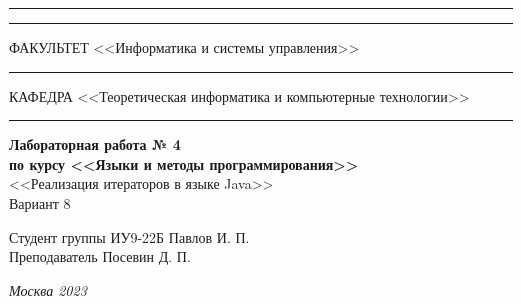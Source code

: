 \documentclass[a4paper, 14pt]{extarticle}
\begin{document}
\begin{titlepage}
\vspace{-25pt}
\hspace{-35pt}\rule{\textwidth}{2.3pt}

\vspace*{-20.3pt}
\hspace{-35pt}\rule{\textwidth}{0.4pt}

\vspace{1.5ex}
\hspace{-35pt} \noindent \small ФАКУЛЬТЕТ\hspace{80pt} <<Информатика и системы управления>>

\vspace*{-16pt}
\hspace{47pt}\rule{0.83\textwidth}{0.4pt}

\vspace{0.5ex}
\hspace{-35pt} \noindent \small КАФЕДРА\hspace{50pt} <<Теоретическая информатика и компьютерные технологии>>

\vspace*{-16pt}
\hspace{30pt}\rule{0.866\textwidth}{0.4pt}
  
\vspace{11em}

\begin{center}
\Large {\bf Лабораторная работа № 4} \\ 
\large {\bf по курсу <<Языки и методы программирования>>} \\
\large <<Реализация итераторов в языке Java>> \\
\large Вариант 8
\end{center}\normalsize

\vspace{8em}


\begin{flushright}
  {Студент группы ИУ9-22Б Павлов И. П. \hspace*{15pt}\\ 
  \vspace{2ex}
  Преподаватель Посевин Д. П.\hspace*{15pt}}
\end{flushright}

\bigskip

\vfill
 

\begin{center}
\textsl{Москва 2023}
\end{center}
\end{titlepage}
\end{document}
